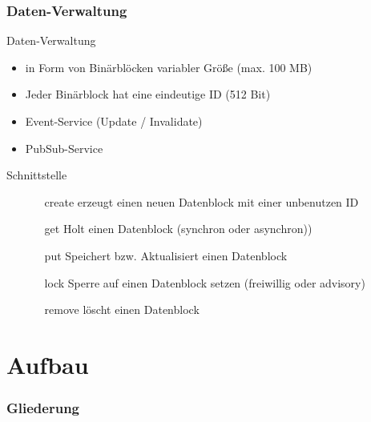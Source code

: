 \documentclass{beamer}
\begin{document}
	\begin{frame}
		\frametitle{Daten-Verwaltung}

		\begin{block}{Daten-Verwaltung}
			\begin{itemize}
				\item in Form von Binärblöcken variabler Größe (max. 100 MB)
				\item Jeder Binärblock hat eine eindeutige ID (512 Bit)
				\item Event-Service (Update / Invalidate)
				\item PubSub-Service
			\end{itemize}
		\end{block}

		\begin{block}{Schnittstelle}
			\begin{itemize}
				\item[] 
				\begin{enumerate}
					\item[create] erzeugt einen neuen Datenblock mit einer unbenutzen ID
					\item[get] Holt einen Datenblock (synchron oder asynchron))
					\item[put] Speichert bzw. Aktualisiert einen Datenblock
					\item[lock] Sperre auf einen Datenblock setzen (freiwillig oder advisory)
					\item[remove] löscht einen Datenblock
				\end{enumerate}
			\end{itemize}
		\end{block}
	\end{frame}

\section{Aufbau}

	\begin{frame}
		\frametitle{Gliederung}

	\end{frame}
\end{document}
